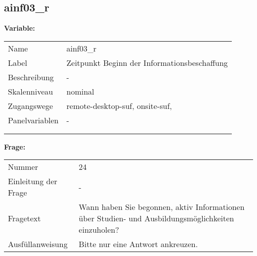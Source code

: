 	
	
	\subsection{ainf03\_r}
	\label{subSection:ainf03_r}

	\noindent\textbf{Variable:}\\
		\begin{tabular}{lL{11.3cm}}
			\label{tableVariable:ainf03_r}
			Name & ainf03\_r \\
			Label & Zeitpunkt Beginn der Informationsbeschaffung  \\
			Beschreibung & - \\
			Skalenniveau & nominal \\
			Zugangswege &
				remote-desktop-suf,
				onsite-suf,
 \\
			Panelvariablen & -
			 \\
			 \\
 \\
		\end{tabular}

		\vspace*{1 cm}
		\noindent\textbf{Frage:}\\
		\begin{tabular}{lL{11.3cm}}
			\label{tableQuestion:ainf03_r}
			Nummer & 24 \\
			Einleitung der Frage & - \\
			Fragetext & Wann haben Sie begonnen, aktiv Informationen über Studien- und Ausbildungsmöglichkeiten einzuholen? \\
			Ausfüllanweisung & Bitte nur eine Antwort ankreuzen. \\
		\end{tabular}





